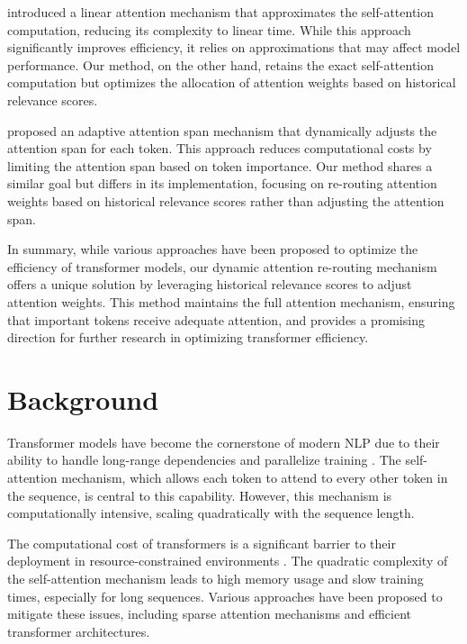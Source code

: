 \documentclass{article} %
\begin{document}
\citet{Katharopoulos2020TransformersAR} introduced a linear attention mechanism that approximates the self-attention computation, reducing its complexity to linear time. While this approach significantly improves efficiency, it relies on approximations that may affect model performance. Our method, on the other hand, retains the exact self-attention computation but optimizes the allocation of attention weights based on historical relevance scores.

\citet{Sukhbaatar2019AdaptiveAS} proposed an adaptive attention span mechanism that dynamically adjusts the attention span for each token. This approach reduces computational costs by limiting the attention span based on token importance. Our method shares a similar goal but differs in its implementation, focusing on re-routing attention weights based on historical relevance scores rather than adjusting the attention span.

In summary, while various approaches have been proposed to optimize the efficiency of transformer models, our dynamic attention re-routing mechanism offers a unique solution by leveraging historical relevance scores to adjust attention weights. This method maintains the full attention mechanism, ensuring that important tokens receive adequate attention, and provides a promising direction for further research in optimizing transformer efficiency.

\section{Background}
\label{sec:background}

Transformer models have become the cornerstone of modern NLP due to their ability to handle long-range dependencies and parallelize training \cite{vaswani2017attention}. The self-attention mechanism, which allows each token to attend to every other token in the sequence, is central to this capability. However, this mechanism is computationally intensive, scaling quadratically with the sequence length.

The computational cost of transformers is a significant barrier to their deployment in resource-constrained environments \cite{Beltagy2020LongformerTL, Kaur2023SurveyOC}. The quadratic complexity of the self-attention mechanism leads to high memory usage and slow training times, especially for long sequences. Various approaches have been proposed to mitigate these issues, including sparse attention mechanisms and efficient transformer architectures.
\end{document}
